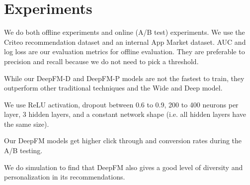 \documentclass[a4paper]{article}
\begin{document}
\section{Experiments}
We do both offline experiments and online (A/B test) experiments. We use the
Criteo recommendation dataset and an internal App Market dataset. AUC and
log loss are our evaluation metrics for offline evaluation. They are preferable
to precision and recall because we do not need to pick a threshold.

While our DeepFM-D and DeepFM-P models are not the fastest to train, they
outperform other traditional techniques and the Wide and Deep model.

We use ReLU activation, dropout between 0.6 to 0.9, 200 to 400 neurons per
layer, 3 hidden layers, and a constant network shape (i.e. all hidden layers
have the same size).

Our DeepFM models get higher click through and conversion rates during the A/B
testing.

We do simulation to find that DeepFM also gives a good level of diversity
and personalization in its recommendations.
\end{document}
